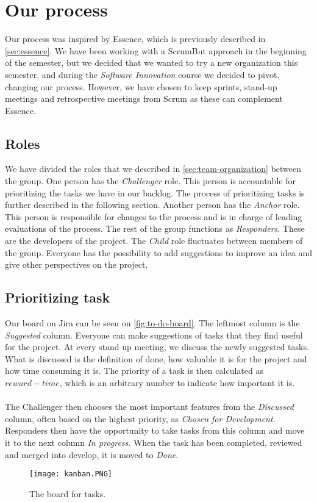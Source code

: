 \section{Our process}
Our process was inspired by Essence, which is previously described in \autoref{sec:essence}.
We have been working with a ScrumBut approach in the beginning of the semester, but we decided that we wanted to try a new organization this semester, and during the \textit{Software Innovation} course we decided to pivot, changing our process.
However, we have chosen to keep sprints, stand-up meetings and retrospective meetings from Scrum as these can complement Essence.

\subsection{Roles}
We have divided the roles that we described in \autoref{sec:team-organization} between the group.
One person has the \textit{Challenger} role.
This person is accountable for prioritizing the tasks we have in our backlog.
The process of prioritizing tasks is further described in the following section.
Another person has the \textit{Anchor} role.
This person is responsible for changes to the process and is in charge of leading evaluations of the process.
The rest of the group functions as \textit{Responders}.
These are the developers of the project.
The \textit{Child} role fluctuates between members of the group.
Everyone has the possibility to add suggestions to improve an idea and give other perspectives on the project.

\subsection{Prioritizing task}
Our board on Jira can be seen on \autoref{fig:to-do-board}.
The leftmost column is the \textit{Suggested} column.
Everyone can make suggestions of tasks that they find useful for the project.
At every stand up meeting, we discuss the newly suggested tasks.
What is discussed is the definition of done, how valuable it is for the project and how time consuming it is.
The priority of a task is then calculated as $reward - time$, which is an arbitrary number to indicate how important it is.
\\\\
The Challenger then chooses the most important features from the \textit{Discussed} column, often based on the highest priority, as \textit{Chosen for Development}.
Responders then have the opportunity to take tasks from this column and move it to the next column \textit{In progress}.
When the task has been completed, reviewed and merged into develop, it is moved to \textit{Done}.
\begin{figure}[H]
    \centering
    \texttt{[image: kanban.PNG]}
    \caption{The board for tasks.}
    \label{fig:to-do-board}
\end{figure}

